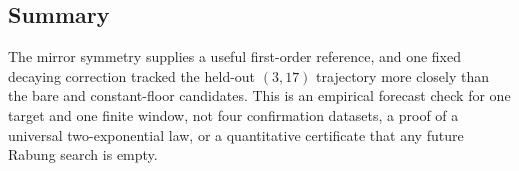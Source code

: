 \subsection{Summary}\label{ss:densitysummary}

The mirror symmetry supplies a useful first-order reference, and one fixed
decaying correction tracked the held-out $(3,17)$ trajectory more closely than
the bare and constant-floor candidates.  This is an empirical forecast check
for one target and one finite window, not four confirmation datasets, a proof
of a universal two-exponential law, or a quantitative certificate that any
future Rabung search is empty.
